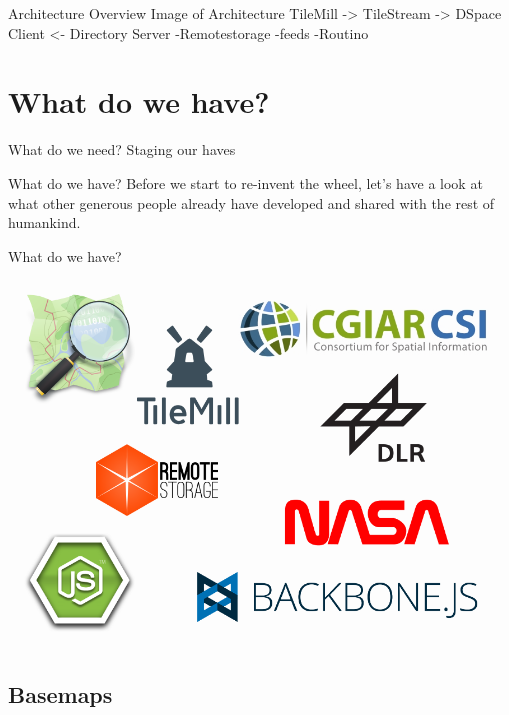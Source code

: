 \documentclass{beamer}
\begin{document}
\begin{frame}{Architecture Overview}
Image of Architecture
TileMill -> TileStream -> DSpace Client <- Directory Server
-Remotestorage
-feeds
-Routino

\end{frame}



\section{What do we have?}

\begin{frame}{What do we need?}
 Staging our haves
\end{frame}

\begin{frame}{What do we have?}
 Before we start to re-invent the wheel, let's have a look at what other
 generous people already have developed and shared with the rest of humankind.
\end{frame}

\begin{frame}{What do we have?}
 \vspace{0.8em}
 \begin{center}
  \includegraphics[scale=0.281]{logos}
 \end{center}
\end{frame}


\subsection{Basemaps}
\end{document}
